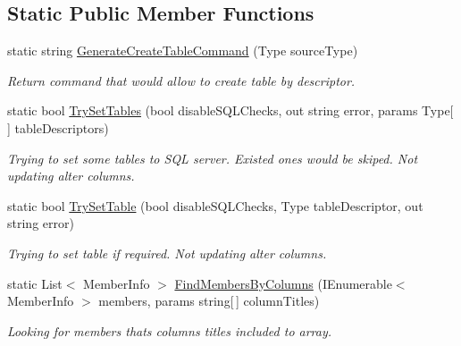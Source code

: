 \subsection*{Static Public Member Functions}
\begin{DoxyCompactItemize}
\item 
static string \mbox{\hyperlink{class_uniform_data_operator_1_1_sql_1_1_tables_1_1_attributes_1_1_table_aab5f211f9d9f392317fbe610ba63d91c}{Generate\+Create\+Table\+Command}} (Type source\+Type)
\begin{DoxyCompactList}\small\item\em Return command that would allow to create table by descriptor. \end{DoxyCompactList}\item 
static bool \mbox{\hyperlink{class_uniform_data_operator_1_1_sql_1_1_tables_1_1_attributes_1_1_table_ac3f20322c0c96c7cbd876d4a8bc29656}{Try\+Set\+Tables}} (bool disable\+S\+Q\+L\+Checks, out string error, params Type\mbox{[}$\,$\mbox{]} table\+Descriptors)
\begin{DoxyCompactList}\small\item\em Trying to set some tables to S\+QL server. Existed ones would be skiped. Not updating alter columns. \end{DoxyCompactList}\item 
static bool \mbox{\hyperlink{class_uniform_data_operator_1_1_sql_1_1_tables_1_1_attributes_1_1_table_a609ed9b13e7e9007709d76a6f08d96e8}{Try\+Set\+Table}} (bool disable\+S\+Q\+L\+Checks, Type table\+Descriptor, out string error)
\begin{DoxyCompactList}\small\item\em Trying to set table if required. Not updating alter columns. \end{DoxyCompactList}\item 
static List$<$ Member\+Info $>$ \mbox{\hyperlink{class_uniform_data_operator_1_1_sql_1_1_tables_1_1_attributes_1_1_table_a8886912a323f3a9e1da5e23c8dd45ca0}{Find\+Members\+By\+Columns}} (I\+Enumerable$<$ Member\+Info $>$ members, params string\mbox{[}$\,$\mbox{]} column\+Titles)
\begin{DoxyCompactList}\small\item\em Looking for members that\textquotesingle{}s column\textquotesingle{}s titles included to array. \end{DoxyCompactList}\end{DoxyCompactItemize}
